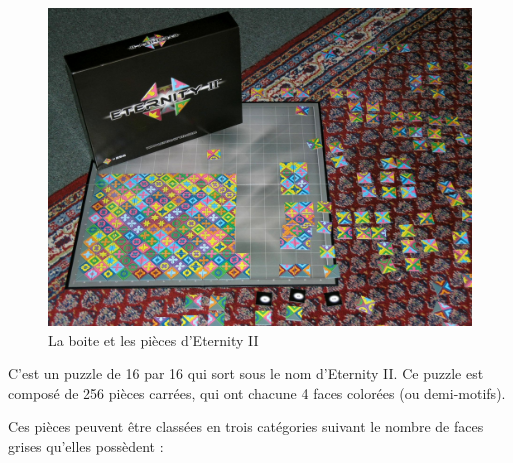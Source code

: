 	\begin{figure}[H]
		\includegraphics[width=\linewidth]{images/eternity_2.jpg}
		\caption{La boite et les pièces d'Eternity II}
		\label{fig:eternity_2}
	\end{figure}
	
	C'est un puzzle de 16 par 16 qui sort sous le nom d'Eternity II. Ce puzzle est composé de 256 pièces carrées, qui ont chacune 4 faces colorées (ou demi-motifs).
	
	Ces pièces peuvent être classées en trois catégories suivant le nombre de faces grises qu'elles possèdent :
	
